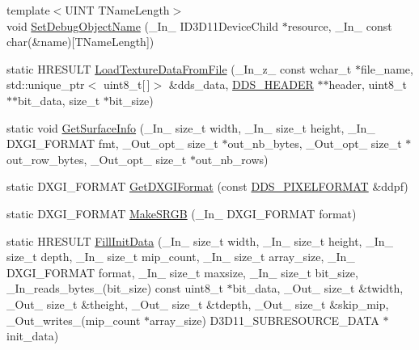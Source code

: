 \begin{DoxyCompactItemize}
\item 
{\footnotesize template$<$U\+I\+NT T\+Name\+Length$>$ }\\void \hyperlink{namespacemage_a88833e1a7c6ad614ff6e88cb10eff532}{Set\+Debug\+Object\+Name} (\+\_\+\+In\+\_\+ I\+D3\+D11\+Device\+Child $\ast$resource, \+\_\+\+In\+\_\+ const char(\&name)\mbox{[}T\+Name\+Length\mbox{]})
\item 
static H\+R\+E\+S\+U\+LT \hyperlink{namespacemage_ad1df9b8a27dd30528717777fd0c9c3db}{Load\+Texture\+Data\+From\+File} (\+\_\+\+In\+\_\+z\+\_\+ const wchar\+\_\+t $\ast$file\+\_\+name, std\+::unique\+\_\+ptr$<$ uint8\+\_\+t\mbox{[}$\,$\mbox{]}$>$ \&dds\+\_\+data, \hyperlink{structmage_1_1_d_d_s___h_e_a_d_e_r}{D\+D\+S\+\_\+\+H\+E\+A\+D\+ER} $\ast$$\ast$header, uint8\+\_\+t $\ast$$\ast$bit\+\_\+data, size\+\_\+t $\ast$bit\+\_\+size)
\item 
static void \hyperlink{namespacemage_a7b67bb6f38f3e787fb3561d236b88bd2}{Get\+Surface\+Info} (\+\_\+\+In\+\_\+ size\+\_\+t width, \+\_\+\+In\+\_\+ size\+\_\+t height, \+\_\+\+In\+\_\+ D\+X\+G\+I\+\_\+\+F\+O\+R\+M\+AT fmt, \+\_\+\+Out\+\_\+opt\+\_\+ size\+\_\+t $\ast$out\+\_\+nb\+\_\+bytes, \+\_\+\+Out\+\_\+opt\+\_\+ size\+\_\+t $\ast$out\+\_\+row\+\_\+bytes, \+\_\+\+Out\+\_\+opt\+\_\+ size\+\_\+t $\ast$out\+\_\+nb\+\_\+rows)
\item 
static D\+X\+G\+I\+\_\+\+F\+O\+R\+M\+AT \hyperlink{namespacemage_a4fecf9823aec7c5ba078acf6bd73f983}{Get\+D\+X\+G\+I\+Format} (const \hyperlink{structmage_1_1_d_d_s___p_i_x_e_l_f_o_r_m_a_t}{D\+D\+S\+\_\+\+P\+I\+X\+E\+L\+F\+O\+R\+M\+AT} \&ddpf)
\item 
static D\+X\+G\+I\+\_\+\+F\+O\+R\+M\+AT \hyperlink{namespacemage_a35ccdb42bbc027d3678b849fb962f3d3}{Make\+S\+R\+GB} (\+\_\+\+In\+\_\+ D\+X\+G\+I\+\_\+\+F\+O\+R\+M\+AT format)
\item 
static H\+R\+E\+S\+U\+LT \hyperlink{namespacemage_ac20162a68be6828c38072a3afb0711c1}{Fill\+Init\+Data} (\+\_\+\+In\+\_\+ size\+\_\+t width, \+\_\+\+In\+\_\+ size\+\_\+t height, \+\_\+\+In\+\_\+ size\+\_\+t depth, \+\_\+\+In\+\_\+ size\+\_\+t mip\+\_\+count, \+\_\+\+In\+\_\+ size\+\_\+t array\+\_\+size, \+\_\+\+In\+\_\+ D\+X\+G\+I\+\_\+\+F\+O\+R\+M\+AT format, \+\_\+\+In\+\_\+ size\+\_\+t maxsize, \+\_\+\+In\+\_\+ size\+\_\+t bit\+\_\+size, \+\_\+\+In\+\_\+reads\+\_\+bytes\+\_\+(bit\+\_\+size) const uint8\+\_\+t $\ast$bit\+\_\+data, \+\_\+\+Out\+\_\+ size\+\_\+t \&twidth, \+\_\+\+Out\+\_\+ size\+\_\+t \&theight, \+\_\+\+Out\+\_\+ size\+\_\+t \&tdepth, \+\_\+\+Out\+\_\+ size\+\_\+t \&skip\+\_\+mip, \+\_\+\+Out\+\_\+writes\+\_\+(mip\+\_\+count $\ast$array\+\_\+size) D3\+D11\+\_\+\+S\+U\+B\+R\+E\+S\+O\+U\+R\+C\+E\+\_\+\+D\+A\+TA $\ast$init\+\_\+data)

\end{DoxyCompactItemize}
